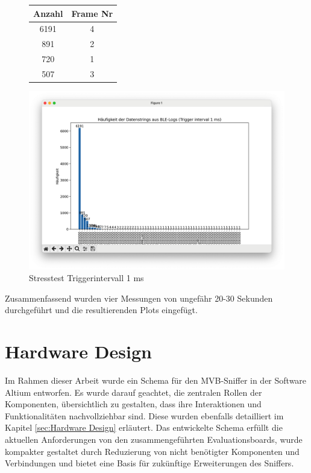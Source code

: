 \begin{figure}[H]
    \centering
    \begin{minipage}{0.29 \textwidth}
        \begin{tabular}{c||c}
            \toprule
            \textbf{Anzahl} & \textbf{Frame Nr} \\ 
            \midrule
            6191 & 4\\
            891 & 2 \\
            720 & 1 \\
            507 & 3 \\
            \bottomrule
        \end{tabular}
    \end{minipage}
    \hfill
    \begin{minipage}{0.7 \textwidth}
        \includegraphics[width=\linewidth]{Figures/Chap4/Stesstest/Stress_1.png}
    \caption{Stresstest Triggerintervall 1 ms}
    \label{fig:Stress1}
    \end{minipage}
\end{figure}

Zusammenfassend wurden vier Messungen von ungefähr 20-30 Sekunden durchgeführt und die resultierenden Plots eingefügt.

\section{Hardware Design}
\label{sec:ResultatHardware}
Im Rahmen dieser Arbeit wurde ein Schema für den MVB-Sniffer in der Software Altium entworfen. Es wurde darauf geachtet, die zentralen Rollen der Komponenten, übersichtlich zu gestalten, dass ihre Interaktionen und Funktionalitäten nachvollziehbar sind. Diese wurden ebenfalls detailliert im Kapitel \ref{sec:Hardware Design} erläutert. Das entwickelte Schema erfüllt die aktuellen Anforderungen von den zusammengeführten Evaluationsboards, wurde kompakter gestaltet durch Reduzierung von nicht benötigter Komponenten und Verbindungen und bietet eine Basis für zukünftige Erweiterungen des Sniffers. 

